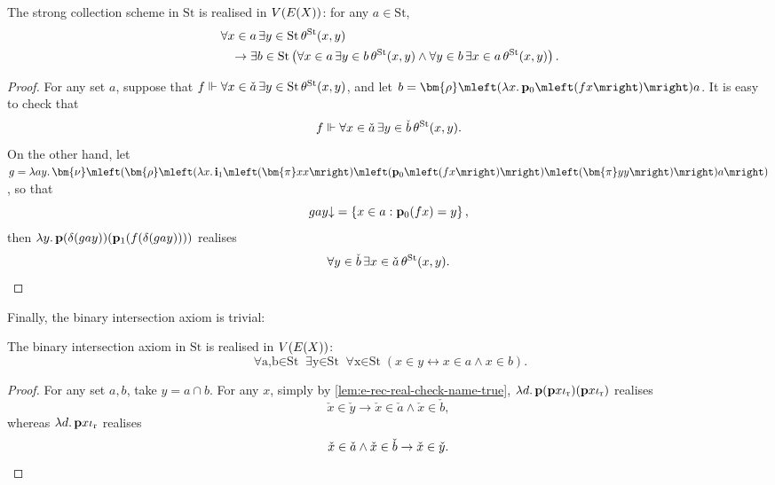 \documentclass[12pt,openany]{book}
\theoremstyle{plain}
\theoremstyle{definition}
\newcommand\opA[1]{\mathop{\forall #1}}
\newcommand\opE[1]{\mathop{\exists #1}}
\newcommand\oplam[1]{\mathop{\lambda #1.}}
\newcommand\bp{\mathbf{p}}
\newcommand\bi{\mathbf{i}}
\newcommand\ior{\iota_\textup{r}}
\newcommand\St{\mathrm{St}}
\begin{document}
\begin{lemma}
  \label{lem:e-rec-st-str-coll}
  The strong collection scheme in $\St$ is realised in $V\mleft(E\mleft(X\mright)\mright)$: for any $a \in \St$,
  \begin{align*}
     & \opA{x \in a} \opE{y \in \St} \theta^\St\mleft(x, y\mright)                                                                                                                  \\
     & \quad {} \rightarrow \opE{b \in \St} \left(\opA{x \in a} \opE{y \in b} \theta^\St\mleft(x, y\mright) \land \opA{y \in b} \opE{x \in a} \theta^\St\mleft(x, y\mright)\right).
  \end{align*}
\end{lemma}

\begin{proof}
  For any set $a$, suppose that $f \Vdash \opA{x \in \check{a}} \opE{y \in \St} \theta^\St\mleft(x, y\mright)$, and let $b = \bm{\rho} \mleft(\oplam{x} \bp_0 \mleft(fx\mright)\mright) a$. It is easy to check that
  \[f \Vdash \opA{x \in \check{a}} \opE{y \in \check{b}} \theta^\St\mleft(x, y\mright).\]
  On the other hand, let $g = \oplam{ay} \bm{\nu} \mleft(\bm{\rho} \mleft(\oplam{x} \bi_1 \mleft(\bm{\pi} xx\mright) \mleft(\bp_0 \mleft(fx\mright)\mright) \mleft(\bm{\pi} yy\mright)\mright) a\mright)$, so that
  \[gay {\downarrow} = \left\{x \in a : \bp_0 \mleft(fx\mright) = y\right\},\]
  then $\oplam{y} \bp \mleft(\delta \mleft(gay\mright)\mright) \mleft(\bp_1 \mleft(f \mleft(\delta \mleft(gay\mright)\mright)\mright)\mright)$ realises
  \[\opA{y \in \check{b}} \opE{x \in \check{a}} \theta^\St\mleft(x, y\mright). \qedhere\]
\end{proof}

Finally, the binary intersection axiom is trivial:
\begin{lemma}
  The binary intersection axiom in $\St$ is realised in $V\mleft(E\mleft(X\mright)\mright)$:
  \[\opA{a, b \in \St} \opE{y \in \St} \opA{x \in \St} \left(x \in y \leftrightarrow x \in a \land x \in b\right).\]
\end{lemma}

\begin{proof}
  For any set $a, b$, take $y = a \cap b$. For any $x$, simply by \autoref{lem:e-rec-real-check-name-true}, $\oplam{d} \bp \mleft(\bp x \ior\mright) \mleft(\bp x \ior\mright)$ realises
  \[\check{x} \in \check{y} \rightarrow \check{x} \in \check{a} \land \check{x} \in \check{b},\]
  whereas $\oplam{d} \bp x \ior$ realises
  \[\check{x} \in \check{a} \land \check{x} \in \check{b} \rightarrow \check{x} \in \check{y}. \qedhere\]
\end{proof}
\end{document}

